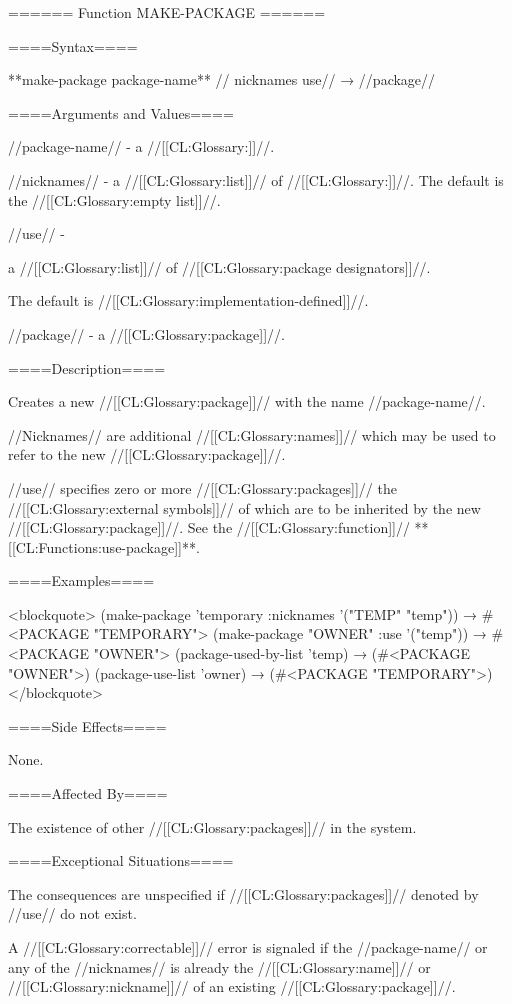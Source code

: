 ====== Function MAKE-PACKAGE ======

====Syntax====

**make-package {package-name** //\key} nicknames use// → //package//

====Arguments and Values====

//package-name// - a //[[CL:Glossary:\packagenamedesignator]]//.

//nicknames// - a //[[CL:Glossary:list]]// of //[[CL:Glossary:\packagenamedesignators]]//. The default is the //[[CL:Glossary:empty list]]//.

//use// -

a //[[CL:Glossary:list]]// of //[[CL:Glossary:package designators]]//.

The default is //[[CL:Glossary:implementation-defined]]//.

//package// - a //[[CL:Glossary:package]]//.

====Description====

Creates a new //[[CL:Glossary:package]]// with the name //package-name//.

//Nicknames// are additional //[[CL:Glossary:names]]// which may be used to refer to the new //[[CL:Glossary:package]]//.

//use// specifies zero or more //[[CL:Glossary:packages]]// the //[[CL:Glossary:external symbols]]// of which are to be inherited by the new //[[CL:Glossary:package]]//. See the //[[CL:Glossary:function]]// **[[CL:Functions:use-package]]**.

====Examples====

<blockquote> (make-package 'temporary :nicknames '("TEMP" "temp")) → #<PACKAGE "TEMPORARY"> (make-package "OWNER" :use '("temp")) → #<PACKAGE "OWNER"> (package-used-by-list 'temp) → (#<PACKAGE "OWNER">) (package-use-list 'owner) → (#<PACKAGE "TEMPORARY">) </blockquote>

====Side Effects====

None.

====Affected By====

The existence of other //[[CL:Glossary:packages]]// in the system.

====Exceptional Situations====

The consequences are unspecified if //[[CL:Glossary:packages]]// denoted by //use// do not exist.

A //[[CL:Glossary:correctable]]// error is signaled if the //package-name// or any of the //nicknames// is already the //[[CL:Glossary:name]]// or //[[CL:Glossary:nickname]]// of an existing //[[CL:Glossary:package]]//.

